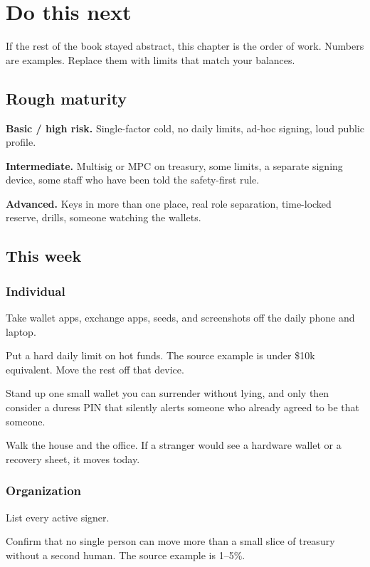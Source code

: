 \chapter{Do this next}

If the rest of the book stayed abstract, this chapter is
the order of work. Numbers are examples. Replace them
with limits that match your balances.

\section{Rough maturity}

\textbf{Basic / high risk.} Single-factor cold, no daily
limits, ad-hoc signing, loud public profile.

\textbf{Intermediate.} Multisig or MPC on treasury, some
limits, a separate signing device, some staff who have
been told the safety-first rule.

\textbf{Advanced.} Keys in more than one place, real role
separation, time-locked reserve, drills, someone watching
the wallets.

\section{This week}

\subsection{Individual}

Take wallet apps, exchange apps, seeds, and screenshots
off the daily phone and laptop.

Put a hard daily limit on hot funds. The source example
is under \$10k equivalent. Move the rest off that device.

Stand up one small wallet you can surrender without
lying, and only then consider a duress PIN that silently
alerts someone who already agreed to be that someone.

Walk the house and the office. If a stranger would see a
hardware wallet or a recovery sheet, it moves today.

\subsection{Organization}

List every active signer.

Confirm that no single person can move more than a small
slice of treasury without a second human. The source
example is 1--5\%.

